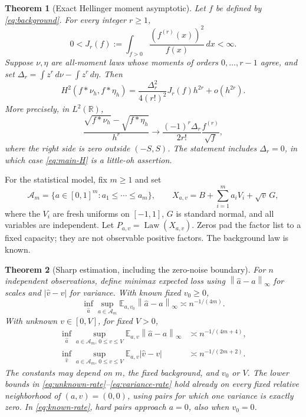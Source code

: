 \documentclass[11pt,a4paper]{article}
\numberwithin{equation}{section}
\newtheorem{theorem}{Theorem}[section]
\theoremstyle{definition}
\theoremstyle{remark}
\DeclareMathOperator{\Law}{Law}
\newcommand{\R}{\mathbb R}
\newcommand{\E}{\mathbb E}
\newcommand{\cA}{\mathcal A}
\newcommand{\norm}[1]{\left\lVert#1\right\rVert}
\begin{document}
\begin{theorem}[Exact Hellinger moment asymptotic]
\label{thm:main-hellinger}
Let $f$ be defined by \eqref{eq:background}. For every integer $r\ge1$,
\begin{equation}
 0<J_r(f):=\int_{f>0}\frac{(f^{(r)}(x))^2}{f(x)}\,dx<\infty.
 \label{eq:J}
\end{equation}
Suppose $\nu,\eta$ are all-moment laws whose moments of orders
$0,\ldots,r-1$ agree, and set
$\Delta_r=\int z^r\,d\nu-\int z^r\,d\eta$. Then
\begin{equation}
 H^2(f*\nu_h,f*\eta_h)
 =\frac{\Delta_r^2}{4(r!)^2}J_r(f)h^{2r}+o(h^{2r}).
 \label{eq:main-H}
\end{equation}
More precisely, in $L^2(\R)$,
\begin{equation}
 \frac{\sqrt{f*\nu_h}-\sqrt{f*\eta_h}}{h^r}
 \longrightarrow
 \frac{(-1)^r\Delta_r}{2r!}\frac{f^{(r)}}{\sqrt f},
 \label{eq:main-root}
\end{equation}
where the right side is zero outside $(-S,S)$. The statement includes
$\Delta_r=0$, in which case \eqref{eq:main-H} is a little-oh assertion.
\end{theorem}

For the statistical model, fix $m\ge1$ and set
\begin{equation}
 \cA_m=\{a\in[0,1]^m:a_1\le\cdots\le a_m\},\qquad
 X_{a,v}=B+\sum_{i=1}^m a_i V_i+\sqrt v\,G,
 \label{eq:model}
\end{equation}
where the $V_i$ are fresh uniforms on $[-1,1]$, $G$ is standard normal, and
all variables are independent. Let $P_{a,v}=\Law(X_{a,v})$.
Zeros pad the factor list to a fixed capacity; they are not observable
positive factors. The background law is known.

\begin{theorem}[Sharp estimation, including the zero-noise boundary]
\label{thm:minimax}
For $n$ independent observations, define minimax expected loss using
$\norm{\widehat a-a}_\infty$ for scales and $|\widehat v-v|$ for variance.
With known fixed $v_0\ge0$,
\begin{equation}
 \inf_{\widehat a}\sup_{a\in\cA_m}
 \E_{a,v_0}\norm{\widehat a-a}_\infty\asymp n^{-1/(4m)}.
 \label{eq:known-rate}
\end{equation}
With unknown $v\in[0,V]$, for fixed $V>0$,
\begin{align}
 \inf_{\widehat a}\sup_{a\in\cA_m,\,0\le v\le V}
 \E_{a,v}\norm{\widehat a-a}_\infty&\asymp n^{-1/(4m+4)},
 \label{eq:unknown-rate}\\
 \inf_{\widehat v}\sup_{a\in\cA_m,\,0\le v\le V}
 \E_{a,v}|\widehat v-v|&\asymp n^{-1/(2m+2)}.
 \label{eq:variance-rate}
\end{align}
The constants may depend on $m$, the fixed background, and $v_0$ or $V$.
The lower bounds in \eqref{eq:unknown-rate}--\eqref{eq:variance-rate} hold
already on every fixed relative neighborhood of $(a,v)=(0,0)$, using pairs
for which one variance is exactly zero. In \eqref{eq:known-rate}, hard pairs
approach $a=0$, also when $v_0=0$.
\end{theorem}
\end{document}
